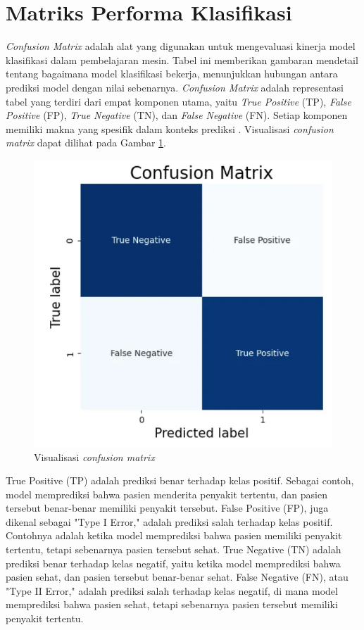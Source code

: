 
\section{Matriks Performa Klasifikasi}

\emph{Confusion Matrix} adalah alat yang digunakan untuk mengevaluasi kinerja model klasifikasi dalam pembelajaran mesin. Tabel ini memberikan gambaran mendetail tentang bagaimana model klasifikasi bekerja, menunjukkan hubungan antara prediksi model dengan nilai sebenarnya. \emph{Confusion Matrix} adalah representasi tabel yang terdiri dari empat komponen utama, yaitu \emph{True Positive} (TP), \emph{False Positive} (FP), \emph{True Negative} (TN), dan \emph{False Negative} (FN). Setiap komponen memiliki makna yang spesifik dalam konteks prediksi \parencite{provost2013data}. Visualisasi \emph{confusion matrix} dapat dilihat pada Gambar \ref{fig:confusion}.

\begin{figure} [ht] \centering
    \includegraphics[width=.5\textwidth]{gambar/bab2/confusion.png}
    \caption{Visualisasi \emph{confusion matrix}}
    \label{fig:confusion}
\end{figure}

True Positive (TP) adalah prediksi benar terhadap kelas positif. Sebagai contoh, model memprediksi bahwa pasien menderita penyakit tertentu, dan pasien tersebut benar-benar memiliki penyakit tersebut. False Positive (FP), juga dikenal sebagai "Type I Error," adalah prediksi salah terhadap kelas positif. Contohnya adalah ketika model memprediksi bahwa pasien memiliki penyakit tertentu, tetapi sebenarnya pasien tersebut sehat. True Negative (TN) adalah prediksi benar terhadap kelas negatif, yaitu ketika model memprediksi bahwa pasien sehat, dan pasien tersebut benar-benar sehat. False Negative (FN), atau "Type II Error," adalah prediksi salah terhadap kelas negatif, di mana model memprediksi bahwa pasien sehat, tetapi sebenarnya pasien tersebut memiliki penyakit tertentu.

